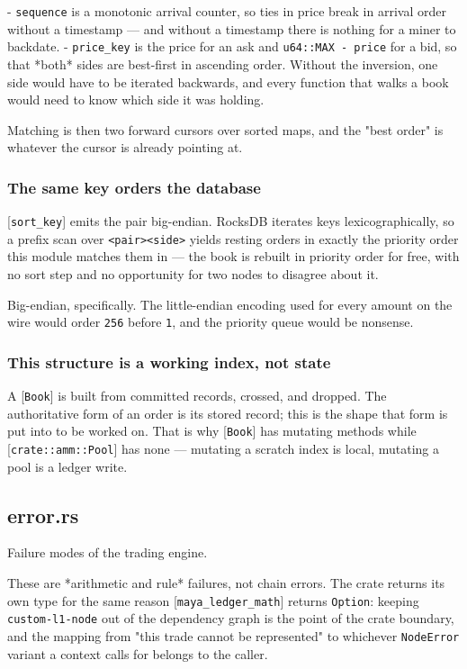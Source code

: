 \documentclass[11pt,a4paper]{article}
\begin{document}
- \texttt{sequence} is a monotonic arrival counter, so ties in price break in
  arrival order without a timestamp — and without a timestamp there is
  nothing for a miner to backdate.
- \texttt{price\_key} is the price for an ask and \texttt{u64::MAX - price} for a bid, so
  that *both* sides are best-first in ascending order. Without the
  inversion, one side would have to be iterated backwards, and every
  function that walks a book would need to know which side it was holding.

Matching is then two forward cursors over sorted maps, and the "best order"
is whatever the cursor is already pointing at.

\subsubsection{The same key orders the database}

[\texttt{sort\_key}] emits the pair big-endian. RocksDB iterates keys
lexicographically, so a prefix scan over \texttt{<pair><side>} yields resting
orders in exactly the priority order this module matches them in — the book
is rebuilt in priority order for free, with no sort step and no opportunity
for two nodes to disagree about it.

Big-endian, specifically. The little-endian encoding used for every amount
on the wire would order \texttt{256} before \texttt{1}, and the priority queue would be
nonsense.

\subsubsection{This structure is a working index, not state}

A [\texttt{Book}] is built from committed records, crossed, and dropped. The
authoritative form of an order is its stored record; this is the shape that
form is put into to be worked on. That is why [\texttt{Book}] has mutating methods
while [\texttt{crate::amm::Pool}] has none — mutating a scratch index is local,
mutating a pool is a ledger write.

\subsection{error.rs}
Failure modes of the trading engine.

These are *arithmetic and rule* failures, not chain errors. The crate
returns its own type for the same reason [\texttt{maya\_ledger\_math}] returns
\texttt{Option}: keeping \texttt{custom-l1-node} out of the dependency graph is the point
of the crate boundary, and the mapping from "this trade cannot be
represented" to whichever \texttt{NodeError} variant a context calls for belongs to
the caller.
\end{document}
